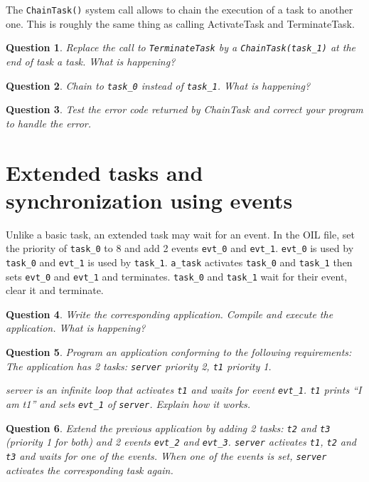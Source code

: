 \documentclass[11pt]{article}
\newtheorem{ex}{Question}
\begin{document}
The \texttt{ChainTask()} system call allows to chain the execution of a task to another one. This is roughly the same thing as calling ActivateTask and TerminateTask.

\begin{ex}
Replace the call to \texttt{TerminateTask} by a \texttt{ChainTask(task_1)} at the end of task a task. What is happening?
\end{ex}

\begin{ex}
Chain to \texttt{task_0} instead of \texttt{task_1}. What is happening?
\end{ex}

\begin{ex}
Test the error code returned by ChainTask and correct your program to
handle the error.
\end{ex}

\section{Extended tasks and synchronization using events}

Unlike a basic task, an extended task may wait for an event. In the OIL file, set the priority of \texttt{task_0} to 8 and add 2 events \texttt{evt_0} and \texttt{evt_1}. \texttt{evt_0} is used by \texttt{task_0} and \texttt{evt_1} is used by \texttt{task_1}. \texttt{a_task} activates \texttt{task_0} and \texttt{task_1} then sets \texttt{evt_0} and \texttt{evt_1} and terminates. \texttt{task_0} and \texttt{task_1} wait for their event, clear it and terminate.

\begin{ex}
Write the corresponding application. Compile and execute the application. What is happening?
\end{ex}

\begin{ex}
Program an application conforming to the following requirements: The application has 2 tasks:
\texttt{server} priority 2, \texttt{t1} priority 1.

server is an infinite loop that activates \texttt{t1} and waits for event \texttt{evt_1}. \texttt{t1} prints ``I am t1'' and sets \texttt{evt_1} of \texttt{server}. Explain how it works.
\end{ex}

\begin{ex}
Extend the previous application by adding 2 tasks: \texttt{t2} and \texttt{t3} (priority 1 for both) and 2 events \texttt{evt_2} and \texttt{evt_3}. \texttt{server} activates \texttt{t1}, \texttt{t2} and \texttt{t3} and waits for one of the events. When one of the events is set, \texttt{server} activates the corresponding task again.
\end{ex}
\end{document}
